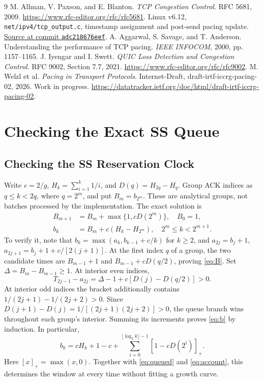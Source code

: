 \documentclass[sigconf,nonacm]{acmart}
\newcommand{\pos}[1]{\left[#1\right]_+}
\begin{document}
\begin{thebibliography}{9}\setlength{\itemsep}{0pt}\setlength{\parskip}{0pt}
 M. Allman, V. Paxson, and E. Blanton. \emph{TCP Congestion Control}. RFC 5681, 2009. \url{https://www.rfc-editor.org/rfc/rfc5681}.
 Linux v6.12, \texttt{net/ipv4/tcp\_output.c}, timestamp assignment and post-send pacing update. \href{https://github.com/torvalds/linux/blob/adc218676eef25575469234709c2d87185ca223a/net/ipv4/tcp_output.c}{Source at commit \texttt{adc218676eef}}.
 A. Aggarwal, S. Savage, and T. Anderson. Understanding the performance of TCP pacing. \emph{IEEE INFOCOM}, 2000, pp. 1157--1165.
 J. Iyengar and I. Swett. \emph{QUIC Loss Detection and Congestion Control}. RFC 9002, Section 7.7, 2021. \url{https://www.rfc-editor.org/rfc/rfc9002}.
 M. Welzl et al. \emph{Pacing in Transport Protocols}. Internet-Draft, draft-irtf-iccrg-pacing-02, 2026. Work in progress. \url{https://datatracker.ietf.org/doc/html/draft-irtf-iccrg-pacing-02}.
\end{thebibliography}

\appendix
\section{Checking the Exact SS Queue}\label{app:ssclock}
\subsection{Checking the SS Reservation Clock}
Write $c=2/g$, $H_k=\sum_{i=1}^k1/i$, and $D(q)=H_{2q}-H_q$. Group ACK indices as $q\le k<2q$, where $q=2^m$, and put $B_m=b_{2^m}$. These are analytical groups, not batches processed by the implementation. The exact solution is
\begin{align}
 B_{m+1}&=B_m+\max\{1,cD(2^m)\},\quad B_0=1,\label{eq:B}\\
 b_k&=B_m+c(H_k-H_{2^m}),\quad 2^m\le k<2^{m+1}.\label{eq:b}
\end{align}
To verify it, note that $b_k=\max(a_k,b_{k-1}+c/k)$ for $k\ge2$, and $a_{2j}=b_j+1$, $a_{2j+1}=b_j+1+c/[2(j+1)]$. At the first index $q$ of a group, the two candidate times are $B_{m-1}+1$ and $B_{m-1}+cD(q/2)$, proving \eqref{eq:B}. Set $\Delta=B_m-B_{m-1}\ge1$. At interior even indices,
\begin{equation}
 T_{2j-1}-a_{2j}=\Delta-1+c[D(j)-D(q/2)]>0.
\end{equation}
At interior odd indices the bracket additionally contains $1/(2j+1)-1/(2j+2)>0$. Since $D(j+1)-D(j)=1/[(2j+1)(2j+2)]>0$, the queue branch wins throughout each group's interior. Summing its increments proves \eqref{eq:b} by induction. In particular,
\begin{equation}
 b_k=cH_k+1-c+
 \sum_{i=0}^{\lfloor\log_2 k\rfloor-1}\pos{1-cD(2^i)}.\label{eq:closed}
\end{equation}
Here $[x]_+=\max(x,0)$. Together with \eqref{eq:queued} and \eqref{eq:account}, this determines the window at every time without fitting a growth curve.
\end{document}
